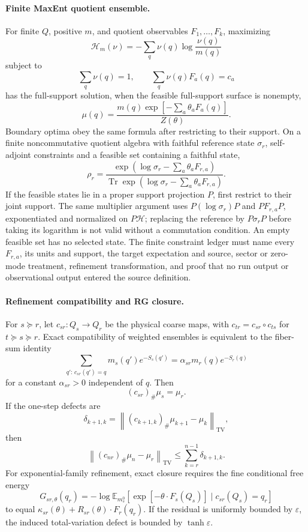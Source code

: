 \paragraph{Finite MaxEnt quotient ensemble.}
For finite \(Q\), positive \(m\), and quotient observables \(F_1,\ldots,F_k\), maximizing
\[
\mathcal H_m(\nu)=-\sum_q\nu(q)\log\frac{\nu(q)}{m(q)}
\]
subject to
\[
\sum_q\nu(q)=1,\qquad \sum_q\nu(q)F_a(q)=c_a
\]
has the full-support solution, when the feasible full-support surface is nonempty,
\[
\mu(q)=
\frac{m(q)\exp[-\sum_a\theta_aF_a(q)]}{Z(\theta)}.
\]
Boundary optima obey the same formula after restricting to their support.  On a finite
noncommutative quotient algebra with faithful reference state \(\sigma_r\),
self-adjoint constraints and a feasible set containing a faithful state,
\[
\rho_r=
\frac{\exp(\log\sigma_r-\sum_a\theta_aF_{r,a})}
{\operatorname{Tr}\exp(\log\sigma_r-\sum_a\theta_aF_{r,a})}.
\]
If the feasible states lie in a proper support projection \(P\), first
restrict to their joint support. The same multiplier argument uses
\(P(\log\sigma_r)P\) and \(PF_{r,a}P\), exponentiated and normalized on
\(P\mathcal H\); replacing the reference by \(P\sigma_rP\) before taking
its logarithm is not valid without a commutation condition. An empty feasible
set has no selected state.
The finite constraint ledger must name every \(F_{r,a}\), its units and support, the target
expectation and source, sector or zero-mode treatment, refinement transformation, and proof that no
run output or observational output entered the source definition.

\paragraph{Refinement compatibility and RG closure.}
For \(s\succeq r\), let \(c_{sr}:Q_s\to Q_r\) be the physical coarse maps, with
\(c_{tr}=c_{sr}\circ c_{ts}\) for \(t\succeq s\succeq r\). Exact compatibility of
weighted ensembles is equivalent to the fiber-sum identity
\[
\sum_{q':\,c_{sr}(q')=q}m_s(q')e^{-S_s(q')}
=
\alpha_{sr}m_r(q)e^{-S_r(q)}
\]
for a constant \(\alpha_{sr}>0\) independent of \(q\).  Then
\[
(c_{sr})_\#\mu_s=\mu_r.
\]
If the one-step defects are
\[
\delta_{k+1,k}
=
\left\|(c_{k+1,k})_\#\mu_{k+1}-\mu_k\right\|_{\mathrm{TV}},
\]
then
\[
\left\|(c_{nr})_\#\mu_n-\mu_r\right\|_{\mathrm{TV}}
\le
\sum_{k=r}^{n-1}\delta_{k+1,k}.
\]
For exponential-family refinement, exact closure requires the fine conditional free energy
\[
G_{sr,\theta}(q_r)
=
-\log\mathbb E_{m_s^0}\left[
\exp[-\theta\cdot F_s(Q_s)]\mid c_{sr}(Q_s)=q_r
\right]
\]
to equal \(\kappa_{sr}(\theta)+R_{sr}(\theta)\cdot F_r(q_r)\).  If the residual is uniformly
bounded by \(\varepsilon\), the induced total-variation defect is bounded by \(\tanh\varepsilon\).

